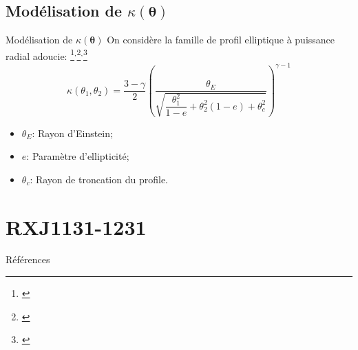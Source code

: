 \documentclass{beamer}
\begin{document}
\subsection{Modélisation de $\kappa(\boldsymbol{ \theta} )$}
\begin{frame}{Modélisation de $\kappa(\boldsymbol{ \theta} )$}
On considère la famille de profil elliptique à puissance radial adoucie:
\footnote{\citet{Barkana1998}}$^{,}$\footnote{\citet{Suyu2013}}$^{,}$\footnote{\citet{Keeton2001}}
\begin{equation}\label{eq:Kappa} 
        \kappa(\theta_1, \theta_2) = \frac{3 - \gamma}{2} 
        \left( \frac{\theta_E}{\sqrt{\dfrac{\theta_1^2}{1 - e} + \theta_2^2(1-e) + 
        \theta_c^2}} \right)^{\gamma-1}
\end{equation} 
\begin{itemize}
        \item $\theta_E$: Rayon d'Einstein;
        \item $e$: Paramètre d'ellipticité;
        \item $\theta_c$: Rayon de troncation du profile.
\end{itemize}
\end{frame}

\section{RXJ1131-1231}
\begin{frame}
		
\end{frame}

\begin{frame}[allowframebreaks]{Références}
        
        
\end{frame}
\end{document}
